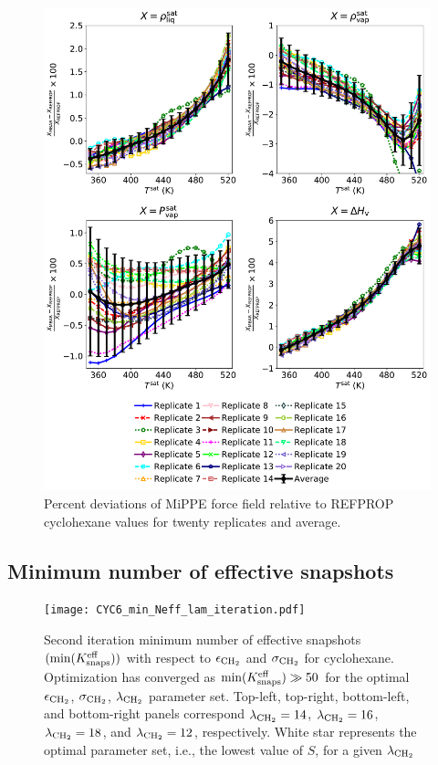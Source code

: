 \documentclass[journal=jctc,manuscript=article]{achemso}
\begin{document}
	\begin{figure}[H]
		\centering
		\includegraphics[width=5.8in]{CYC6_deviations_20replicates.pdf}
		\caption{Percent deviations of MiPPE force field relative to REFPROP cyclohexane values for twenty replicates and average.}
		\label{SI fig: VLE cyclohexane replicates}
	\end{figure}

\newpage
\clearpage

\subsection{Minimum number of effective snapshots} \label{SI sec: Min eff}

\begin{figure}[htb!]
	\centering
	\texttt{[image: CYC6\_min\_Neff\_lam\_iteration.pdf]}
	\caption{Second iteration minimum number of effective snapshots $(\min(K_{\rm snaps}^{\rm eff}))$ with respect to $\epsilon_{\rm CH_2}$ and $\sigma_{\rm CH_2}$ for cyclohexane. Optimization has converged as $\min(K_{\rm snaps}^{\rm eff}) \gg 50$ for the optimal $\epsilon_{\rm CH_2}$, $\sigma_{\rm CH_2}$, $\lambda_{\rm CH_2}$ parameter set. Top-left, top-right, bottom-left, and bottom-right panels correspond $\lambda_{\rm CH_2} = 14$, $\lambda_{\rm CH_2} = 16$, $\lambda_{\rm CH_2} = 18$, and $\lambda_{\rm CH_2} = 12$, respectively. White star represents the optimal parameter set, i.e., the lowest value of $S$, for a given $\lambda_{\rm CH_2}$}
	\label{SI fig:Iterate_Neff_CYC6}
\end{figure}
\end{document}
